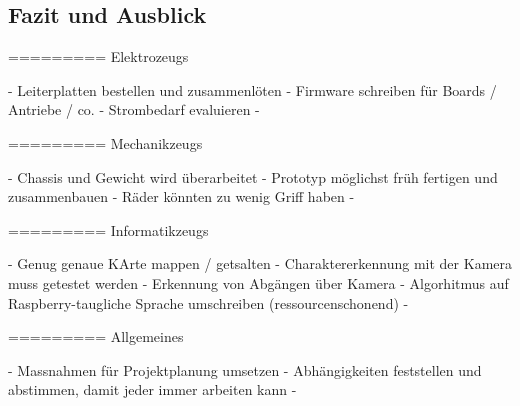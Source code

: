 \documentclass[main.tex]{subfiles} %
\begin{document}

\subsection{Fazit und Ausblick}

========= Elektrozeugs

- Leiterplatten bestellen und zusammenlöten
- Firmware schreiben für Boards / Antriebe / co.
- Strombedarf evaluieren
-

========= Mechanikzeugs

- Chassis und Gewicht wird überarbeitet
- Prototyp möglichst früh fertigen und zusammenbauen
- Räder könnten zu wenig Griff haben
-

========= Informatikzeugs

- Genug genaue KArte mappen / getsalten
- Charaktererkennung mit der Kamera muss getestet werden
- Erkennung von Abgängen über Kamera
- Algorhitmus auf Raspberry-taugliche Sprache umschreiben (ressourcenschonend)
-

========= Allgemeines

- Massnahmen für Projektplanung umsetzen
- Abhängigkeiten feststellen und abstimmen, damit jeder immer arbeiten kann
-
\end{document}
